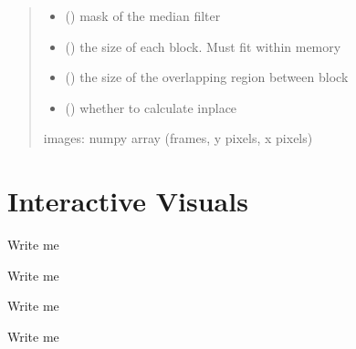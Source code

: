 \documentclass[letterpaper,10pt,english]{sphinxmanual}
\begin{document}
\begin{fulllineitems}
\begin{quote}
\begin{description}
\begin{itemize}
\item {} 
\sphinxAtStartPar
{} (\sphinxstyleliteralemphasis{\sphinxupquote{(}}\sphinxstyleliteralemphasis{\sphinxupquote{(}}\sphinxstyleliteralemphasis{\sphinxupquote{, }}\sphinxstyleliteralemphasis{\sphinxupquote{, }}\sphinxstyleliteralemphasis{\sphinxupquote{)}}\sphinxstyleliteralemphasis{\sphinxupquote{)}}) \textendash{} mask of the median filter

\item {} 
\sphinxAtStartPar
{} () \textendash{} the size of each block. Must fit within memory

\item {} 
\sphinxAtStartPar
{} () \textendash{} the size of the overlapping region between block

\item {} 
\sphinxAtStartPar
{} () \textendash{} whether to calculate in\sphinxhyphen{}place

\end{itemize}

\sphinxAtStartPar
images: numpy array (frames, y pixels, x pixels)

\sphinxAtStartPar
{}

\end{description}\end{quote}

\end{fulllineitems}



\section{Interactive Visuals}
\label{\detokenize{Sub-Packages:interactive-visuals}}\label{\detokenize{Sub-Packages:interactive-visuals-module}}
\begin{DUlineblock}{0em}
\item[] Write me
\item[] Write me
\item[] Write me
\item[] Write me
\end{DUlineblock}
\end{document}
